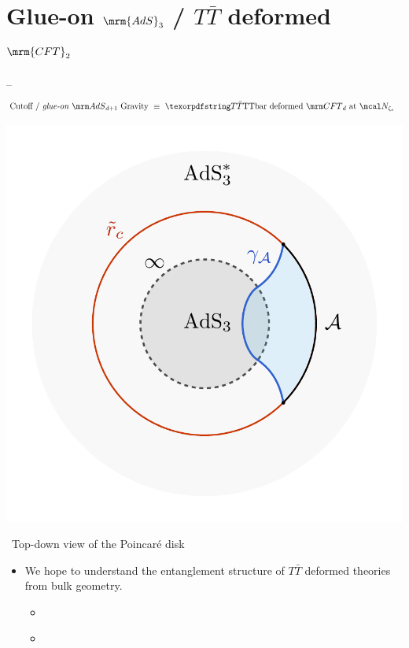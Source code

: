 \documentclass[10pt]{article}
\renewenvironment{frame}[1]%
	{\section*{#1}}%
	{\clearpage}
\newcommand{\pause}{}
\newenvironment{columns}%
	{\par\begin{minipage}{\textwidth}}%
	{\end{minipage}}
\newenvironment{column}[1]%
	{\begin{minipage}{#1}}%
	{\end{minipage}}
\newcommand{\TTbar}{\texorpdfstring{\ensuremath{T\bar{T}}}{TTbar}\xspace}
\begin{document}
\begin{frame}{Glue-on $\mrm{AdS}_3$ / \TTbar deformed $\mrm{CFT}_2$}{%
	\textcite{Apolo:2023vnm} -- 
}
\begin{equation*}
\stateGlueon
\end{equation*}
\begin{columns}
\begin{column}{.3\textwidth}
	\centering
	\includegraphics[width=\linewidth]{img/RT-AdS.pdf}
	\vspace{-1.5\baselineskip}
	
	\vspace{-.3\baselineskip}
	\scriptsize\, Top-down view of the Poincar\'e disk
\end{column}
\hspace{-1em}
\begin{column}{.71\textwidth}
\begin{itemize}

\item We hope to understand the entanglement structure of \TTbar deformed theories from bulk geometry. \pause
	\begin{itemize}
	\item \textcite{Donnelly:2018bef,Lewkowycz:2019xse}
	\item \textcite{He:2023xnb,He:2023wko,Tian:2023fgf,Hou:2023ytl}
	\end{itemize}
\end{itemize}
\end{column}
\end{columns}
\end{frame}
\end{document}
